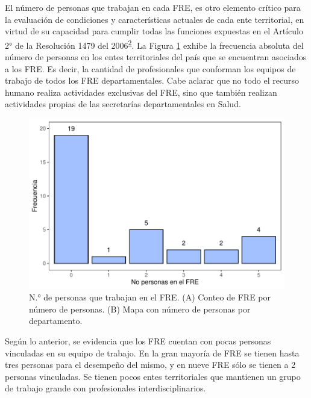 \documentclass[
  oneside]{book}
\begin{document}
El número de personas que trabajan en cada FRE, es otro elemento crítico para la evaluación de condiciones y características actuales de cada ente territorial, en virtud de su capacidad para cumplir todas las funciones expuestas en el Artículo 2° de la Resolución 1479 del 2006\textsuperscript{\protect\hyperlink{ref-MSPS1479-2006}{2}}. La Figura \ref{fig:perfilProfesional3} exhibe la frecuencia absoluta del número de personas en los entes territoriales del país que se encuentran asociados a los FRE. Es decir, la cantidad de profesionales que conforman los equipos de trabajo de todos los FRE departamentales. Cabe aclarar que no todo el recurso humano realiza actividades exclusivas del FRE, sino que también realizan actividades propias de las secretarías departamentales en Salud.

\begin{figure}[b!]

{\centering \includegraphics[width=1\linewidth]{InformeFinal_files/figure-latex/perfilProfesional3-1} 

}

\caption{N.° de personas que trabajan en el FRE. (A) Conteo de FRE por número de personas. (B) Mapa con número de personas por departamento.}\label{fig:perfilProfesional3}
\end{figure}

Según lo anterior, se evidencia que los FRE cuentan con pocas personas vinculadas en su equipo de trabajo. En la gran mayoría de FRE se tienen hasta tres personas para el desempeño del mismo, y en nueve FRE sólo se tienen a 2 personas vinculadas. Se tienen pocos entes territoriales que mantienen un grupo de trabajo grande con profesionales interdisciplinarios.
\end{document}
